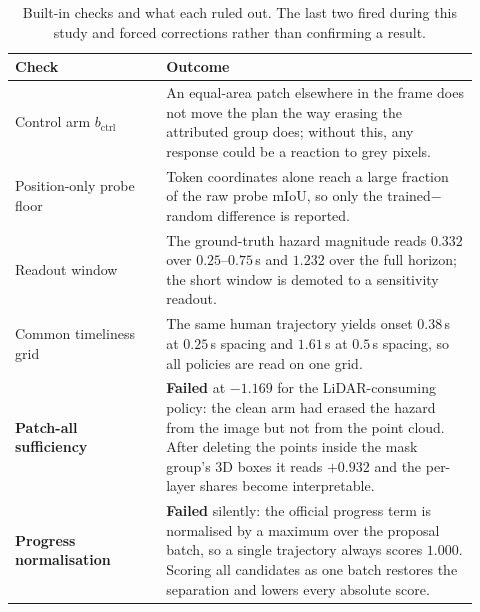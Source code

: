 \begin{table}[t]
\centering
\setlength{\tabcolsep}{4pt}
\footnotesize
\caption{Built-in checks and what each ruled out. The last two fired during this study and forced corrections rather than confirming a result.}
\label{tab:validity}
\begin{tabular}{p{0.30\linewidth}p{0.62\linewidth}}
\toprule
Check & Outcome\\
\midrule
Control arm $b_{\mathrm{ctrl}}$ & An equal-area patch elsewhere in the frame does not move the plan the way erasing the attributed group does; without this, any response could be a reaction to grey pixels.\\
Position-only probe floor & Token coordinates alone reach a large fraction of the raw probe mIoU, so only the trained$-$random difference is reported.\\
Readout window & The ground-truth hazard magnitude reads $0.332$ over $0.25$--$0.75$\,s and $1.232$ over the full horizon; the short window is demoted to a sensitivity readout.\\
Common timeliness grid & The same human trajectory yields onset $0.38$\,s at $0.25$\,s spacing and $1.61$\,s at $0.5$\,s spacing, so all policies are read on one grid.\\
\midrule
\textbf{Patch-all sufficiency} & \textbf{Failed} at $-1.169$ for the LiDAR-consuming policy: the clean arm had erased the hazard from the image but not from the point cloud. After deleting the points inside the mask group's 3D boxes it reads $+0.932$ and the per-layer shares become interpretable.\\
\textbf{Progress normalisation} & \textbf{Failed} silently: the official progress term is normalised by a maximum over the proposal batch, so a single trajectory always scores $1.000$. Scoring all candidates as one batch restores the separation and lowers every absolute score.\\
\bottomrule
\end{tabular}
\end{table}
